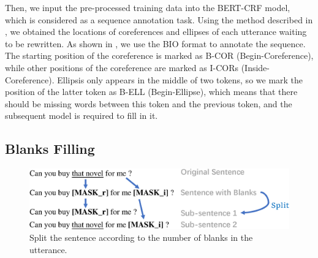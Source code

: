 Then, we input the pre-processed training data into the BERT-CRF \citep{DBLP:journals/corr/abs-1909-10649} 
model, 
which is considered as a sequence annotation task. 
Using the method described in , we obtained the locations of coreferences 
and ellipses of each utterance waiting to be rewritten. As shown in , 
we use the BIO format to annotate the sequence. The starting position of the coreference is 
marked as B-COR (Begin-Coreference), %
while other positions of the coreference are marked as I-CORs (Inside-Coreference). Ellipsis only appears in the middle of two tokens, so we mark the position of the latter token as B-ELL (Begin-Ellipse), which means that there should be missing words between this token and the previous token, and the subsequent model is required to fill in it.






\subsection{Blanks Filling}
\label{blanks-filling}

\begin{figure}[th]
        \centering
        \includegraphics[width=1.0\columnwidth]{add-split.eps}
        \caption{Split the sentence according to the number of blanks in the utterance.}
        \label{fig:add-split}
\end{figure}

